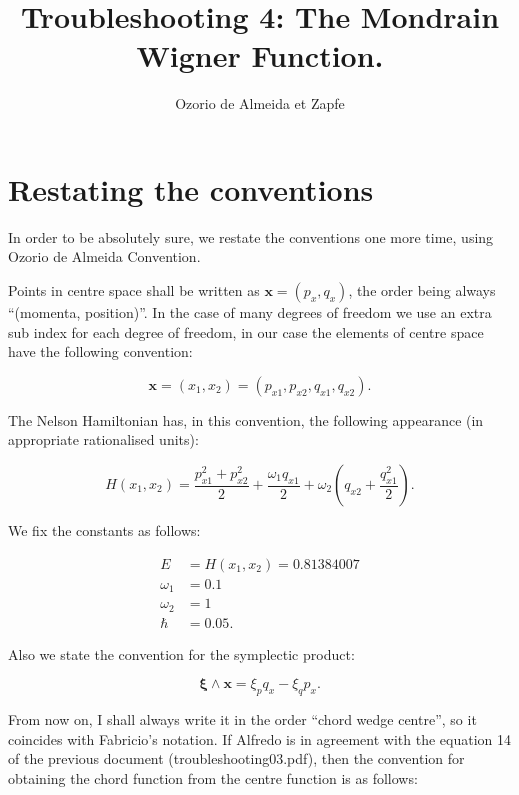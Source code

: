\documentclass[a4paper,12pt]{article}
\title{ Troubleshooting 4: The Mondrain Wigner Function.}
\author{Ozorio de Almeida et Zapfe}
\newcommand{\xfase}{\mathbf{x}}
\newcommand{\xifase}{ {\boldsymbol{\xi}} }
\begin{document}
\maketitle

\section{Restating the conventions}

In order to be absolutely sure, we restate the conventions one more
time, using Ozorio de Almeida Convention.

Points in centre space shall be written as $\xfase=(p_x, q_x)$,
the order being always ``(momenta, position)''. In the case
of many degrees of freedom we use an extra sub index for
each degree of freedom, in our case the elements of centre
space have the following convention:

\begin{equation}\label{convencionpuntos}
\xfase=(x_1,x_2)=(p_{x1},p_{x2},q_{x1},q_{x2}).
\end{equation}

The Nelson Hamiltonian has, in this convention, the following
appearance (in appropriate rationalised units):

\begin{equation}
H(x_1,x_2)=\frac{p_{x1}^2+p_{x2}^2}{2}
+\frac{\omega_1 q_{x1}}{2} +\omega_2 (q_{x2}+\frac{q_{x1}^2}{2}).
\end{equation}

We fix the constants as follows:

\begin{align}
E & =H(x_1,x_2)=0.81384007 \\
\omega_1 &=0.1 \\
\omega_2 &=1 \\
\hbar &=0.05.
\end{align}

Also we state the convention for the symplectic product:

\begin{equation}
\xifase\wedge\xfase=\xi_p q_x -  \xi_q p_x.
\end{equation}

From now on, I shall always write it in the order
``chord wedge centre'', so it coincides with Fabricio's notation.
If Alfredo is in agreement with the equation 14 of the previous
document (troubleshooting03.pdf), then the convention for 
obtaining the chord function from the centre function is as
follows:
\end{document}
